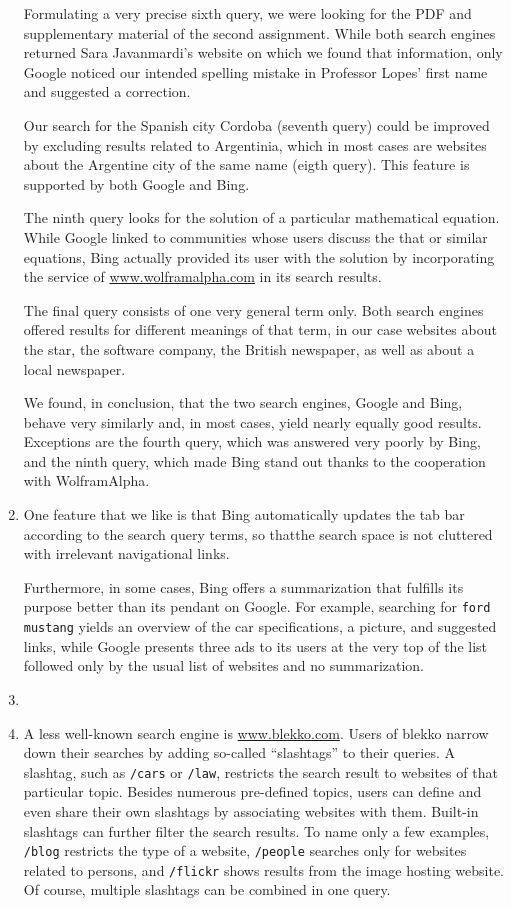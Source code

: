\documentclass[a4paper,11pt,oneside]{book}
\begin{document}
\begin{enumerate}
				Formulating a very precise sixth query, we were looking for the PDF and supplementary material of the second assignment. While both search engines returned Sara Javanmardi's website on which we found that information, only Google noticed our intended spelling mistake in Professor Lopes' first name and suggested a correction. 
				
				Our search for the Spanish city Cordoba (seventh query) could be improved by excluding results related to Argentinia, which in most cases are websites about the Argentine city of the same name (eigth query). This feature is supported by both Google and Bing.
				
				The ninth query looks for the solution of a particular mathematical equation. While Google linked to communities whose users discuss the that or similar equations, Bing actually provided its user with the solution by incorporating the service of \url{www.wolframalpha.com} in its search results.
				
				The final query consists of one very general term only. Both search engines offered results for different meanings of that term, in our case websites about the star, the software company, the British newspaper, as well as about a local newspaper.
				
				We found, in conclusion, that the two search engines, Google and Bing, behave very similarly and, in most cases, yield nearly equally good results. Exceptions are the fourth query, which was answered very poorly by Bing, and the ninth query, which made Bing stand out thanks to the cooperation with WolframAlpha.
				
	\item One feature that we like is that Bing automatically updates the tab bar according to the search query  terms, so thatthe search space is not cluttered with irrelevant navigational links. 
	
		Furthermore, in some cases, Bing offers a summarization that fulfills its purpose better than its pendant on Google. For example, searching for \texttt{ford mustang} yields an overview of the car specifications, a picture, and suggested links, while Google presents three ads to its users at the very top of the list followed only by the usual list of websites and no summarization.
	\item
	\item A less well-known search engine is \url{www.blekko.com}. Users of blekko narrow down their searches by adding so-called ``slashtags'' to their queries. A slashtag, such as \texttt{/cars} or \texttt{/law}, restricts the search result to websites of that particular topic. Besides numerous pre-defined topics, users can define and even share their own slashtags by associating websites with them. Built-in slashtags can further filter the search results. To name only a few examples, \texttt{/blog} restricts the type of a website, \texttt{/people} searches only for websites related to persons, and \texttt{/flickr} shows results from the image hosting website. Of course, multiple slashtags can be combined in one query.
	

\end{enumerate}
\end{document}
